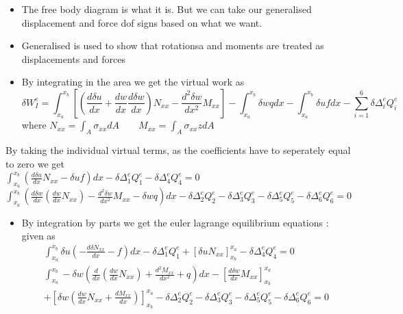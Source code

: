 	\begin{frame}
		\begin{itemize}
			\item The free body diagram is what it is. But we can take our generalised displacement and force dof signs based on what we want.
			\item Generalised is used to show that rotationsa and moments are treated as displacements and forces
			\item By integrating in the area we get the virtual work as 
			\begin{equation}
				\delta W_I^e = \int_{x_a}^{x_b} \left[  \left(\frac{d \delta u}{dx} 
				+ \frac{dw}{dx}\frac{d\delta w}{dx} \right)N_{xx} - \frac{d^2 \delta w}{dx^2} M_{xx}\right] - \int_{x_a}^{x_b} \delta w q dx - \int_{x_a}^{x_b} \delta u f dx  - \sum_{i=1}^{6} \delta \Delta_i^e Q_i^e
			\end{equation}
			where $N_{xx} = \int_A \sigma_{xx}dA \qquad M_{xx} = \int_A \sigma_{xx}zdA$ 
		\end{itemize}
	\end{frame}


	\begin{frame}
		By taking the individual virtual terms, as the coefficients have to seperately equal to zero we get \\
		$\int_{x_a}^{x_b} \left( \frac{d\delta u}{dx}N_{xx} -\delta u f\right)dx - \delta \Delta_1^e Q_1^e - \delta \Delta_4^e Q_4^e = 0$\\
		$\int_{x_a}^{x_b} \left( \frac{d\delta w}{dx}\left(\frac{dw}{dx}N_{xx} \right) -\frac{d^2 \delta w }{dx^2}M_{xx} - \delta w q\right)dx - \delta \Delta_2^e Q_2^e - \delta \Delta_3^e Q_3^e - \delta \Delta_5^e Q_5^e -  \delta\Delta_6^e Q_6^e = 0$
		\begin{itemize}
			\item By integration by parts we get the euler lagrange equilibrium equations : given as 
			\begin{equation}
				\begin{aligned}
					\int_{x_a}^{x_b} \delta u\left( -\frac{d\delta N_{xx}}{dx} - f\right)dx - \delta \Delta_1^e Q_1^e + \left[\delta u N_{xx}\right]_{x_b}^{x_a} - \delta \Delta_4^e Q_4^e = 0\\
					\int_{x_a}^{x_b} - \delta w\left( \frac{d}{dx}\left(\frac{dw}{dx}N_{xx} \right) +\frac{d^2 M_{xx}}{dx^2} + q\right)dx - \left[ \frac{d\delta w}{dx} M_{xx}\right]_{x_b}^{x_a}  \\+  \left[ \delta w \left(\frac{dw}{dx}N_{xx} + \frac{d M_{xx}}{dx}  \right)\right]_{x_b}^{x_a} - \delta \Delta_2^e Q_2^e - \delta \Delta_3^e Q_3^e -  \delta\Delta_5^e Q_5^e -  \delta\Delta_6^e Q_6^e = 0
				\end{aligned}
			\end{equation}
		\end{itemize}
	\end{frame}


